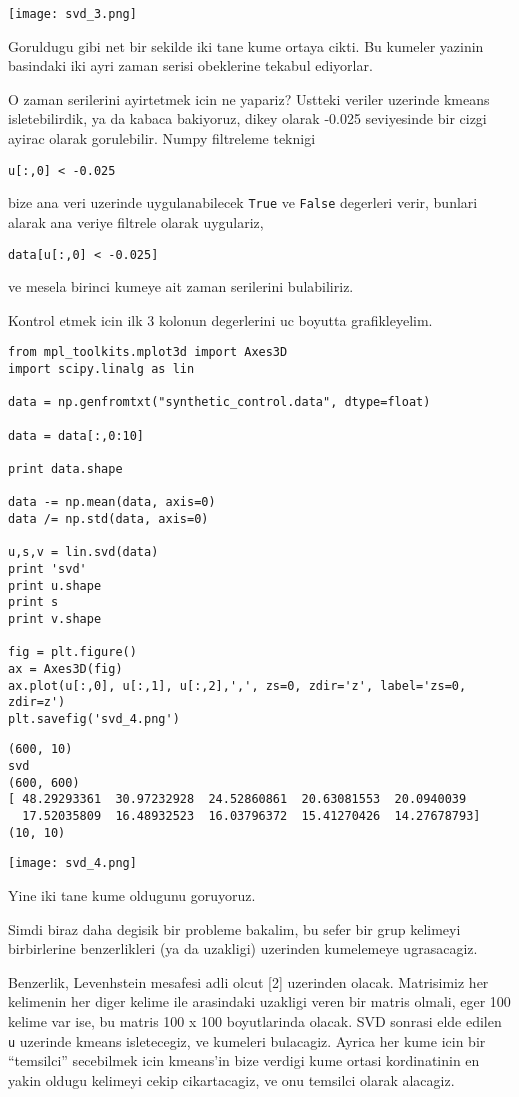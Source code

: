 \documentclass[12pt,fleqn]{article}\usepackage{../common}
\begin{document}
\texttt{[image: svd\_3.png]}

Goruldugu gibi net bir sekilde iki tane kume ortaya cikti. Bu kumeler
yazinin basindaki iki ayri zaman serisi obeklerine tekabul ediyorlar. 

O zaman serilerini ayirtetmek icin ne yapariz? Ustteki veriler uzerinde
kmeans isletebilirdik, ya da kabaca bakiyoruz, dikey olarak -0.025
seviyesinde bir cizgi ayirac olarak gorulebilir. Numpy filtreleme teknigi

\verb!u[:,0] < -0.025!

bize ana veri uzerinde uygulanabilecek \verb!True! ve \verb!False!
degerleri verir, bunlari alarak ana veriye filtrele olarak uygulariz,

\verb!data[u[:,0] < -0.025]!

ve mesela birinci kumeye ait zaman serilerini bulabiliriz. 

Kontrol etmek icin ilk 3 kolonun degerlerini uc boyutta grafikleyelim.

\begin{verbatim}
from mpl_toolkits.mplot3d import Axes3D
import scipy.linalg as lin

data = np.genfromtxt("synthetic_control.data", dtype=float)

data = data[:,0:10]

print data.shape

data -= np.mean(data, axis=0)
data /= np.std(data, axis=0)

u,s,v = lin.svd(data)
print 'svd'
print u.shape
print s
print v.shape

fig = plt.figure()
ax = Axes3D(fig)
ax.plot(u[:,0], u[:,1], u[:,2],',', zs=0, zdir='z', label='zs=0, zdir=z')
plt.savefig('svd_4.png')
\end{verbatim}

\begin{verbatim}
(600, 10)
svd
(600, 600)
[ 48.29293361  30.97232928  24.52860861  20.63081553  20.0940039
  17.52035809  16.48932523  16.03796372  15.41270426  14.27678793]
(10, 10)
\end{verbatim}

\texttt{[image: svd\_4.png]}

Yine iki tane kume oldugunu goruyoruz. 

Simdi biraz daha degisik bir probleme bakalim, bu sefer bir grup kelimeyi
birbirlerine benzerlikleri (ya da uzakligi) uzerinden kumelemeye ugrasacagiz. 

Benzerlik, Levenhstein mesafesi adli olcut [2] uzerinden olacak. Matrisimiz
her kelimenin her diger kelime ile arasindaki uzakligi veren bir matris
olmali, eger 100 kelime var ise, bu matris 100 x 100 boyutlarinda
olacak. SVD sonrasi elde edilen \verb!u! uzerinde kmeans isletecegiz, ve
kumeleri bulacagiz. Ayrica her kume icin bir ``temsilci'' secebilmek icin
kmeans'in bize verdigi kume ortasi kordinatinin en yakin oldugu kelimeyi
cekip cikartacagiz, ve onu temsilci olarak alacagiz.
\end{document}
